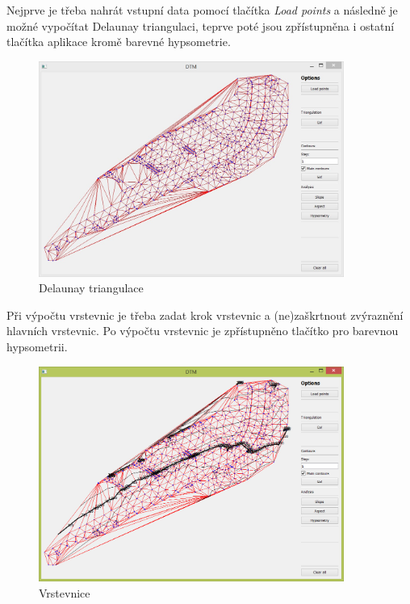 \documentclass[a4paper, 12pt]{article}
\begin{document}
Nejprve je třeba nahrát vstupní data pomocí tlačítka \textit{Load points} a následně je možné vypočítat Delaunay triangulaci, teprve poté jsou zpřístupněna i ostatní tlačítka aplikace kromě barevné hypsometrie. \\

\begin{figure}[h]
	\centering
	\includegraphics[width=10cm]{DT.jpg}
	\caption{Delaunay triangulace}
\end{figure}

\clearpage

Při výpočtu vrstevnic je třeba zadat krok vrstevnic a (ne)zaškrtnout zvýraznění hlavních vrstevnic. Po výpočtu vrstevnic je zpřístupněno tlačítko pro barevnou hypsometrii.

\begin{figure}[h]
	\centering
	\includegraphics[width=10cm]{vrstevnice.jpg}
	\caption{Vrstevnice}
\end{figure}
\end{document}
